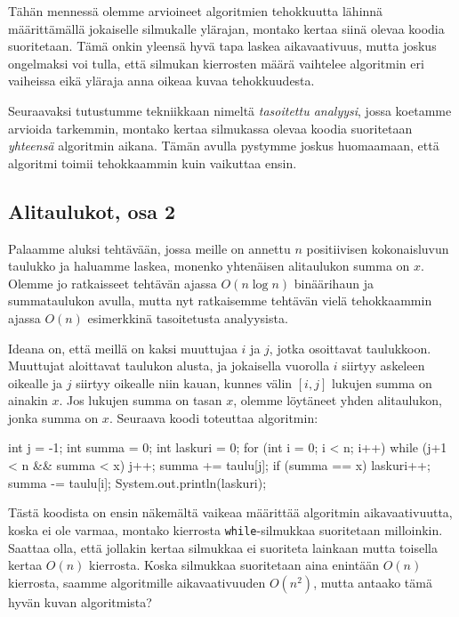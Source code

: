 Tähän mennessä olemme arvioineet algoritmien tehokkuutta
lähinnä määrit\-tämällä jokaiselle silmukalle ylärajan,
montako kertaa siinä olevaa koodia suoritetaan.
Tämä onkin yleensä hyvä tapa laskea aikavaativuus,
mutta joskus ongelmaksi voi tulla, että silmukan kierrosten
määrä vaihtelee algoritmin eri vaiheissa eikä yläraja
anna oikeaa kuvaa tehokkuudesta.

Seuraavaksi tutustumme tekniikkaan nimeltä
\emph{tasoitettu analyysi}, jossa koetamme arvioida tarkemmin,
montako kertaa silmukassa olevaa koodia suoritetaan
\emph{yhteensä} algoritmin aikana.
Tämän avulla pystymme joskus huomaamaan, että algoritmi
toimii tehokkaammin kuin vaikuttaa ensin.

\subsection{Alitaulukot, osa 2}

Palaamme aluksi tehtävään, jossa meille on annettu
$n$ positiivisen kokonaisluvun taulukko ja haluamme laskea,
monenko yhtenäisen alitaulukon summa on $x$.
Olemme jo ratkaisseet tehtävän ajassa $O(n \log n)$
binäärihaun ja summataulukon avulla,
mutta nyt ratkaisemme tehtävän vielä tehokkaammin
ajassa $O(n)$ esimerkkinä tasoitetusta analyysista.

Ideana on, että meillä on kaksi muuttujaa $i$ ja $j$,
jotka osoittavat taulukkoon.
Muuttujat aloittavat taulukon alusta,
ja jokaisella vuorolla $i$ siirtyy askeleen oikealle
ja $j$ siirtyy oikealle niin kauan, kunnes välin $[i,j]$
lukujen summa on ainakin $x$.
Jos lukujen summa on tasan $x$, olemme löytäneet yhden
alitaulukon, jonka summa on $x$.
Seuraava koodi toteuttaa algoritmin:

\begin{code}
int j = -1;
int summa = 0;
int laskuri = 0;
for (int i = 0; i < n; i++) {
    while (j+1 < n && summa < x) {
        j++;
        summa += taulu[j];
    }
    if (summa == x) laskuri++;
    summa -= taulu[i];
}
System.out.println(laskuri);
\end{code}

Tästä koodista on ensin näkemältä vaikeaa määrittää algoritmin
aikavaativuutta, koska ei ole varmaa, montako kierrosta
\texttt{while}-silmukkaa suoritetaan milloinkin.
Saattaa olla, että jollakin kertaa silmukkaa ei suoriteta lainkaan
mutta toisella kertaa $O(n)$ kierrosta.
Koska silmukkaa suoritetaan aina enintään $O(n)$ kierrosta,
saamme algoritmille aikavaativuuden $O(n^2)$,
mutta antaako tämä hyvän kuvan algoritmista?

